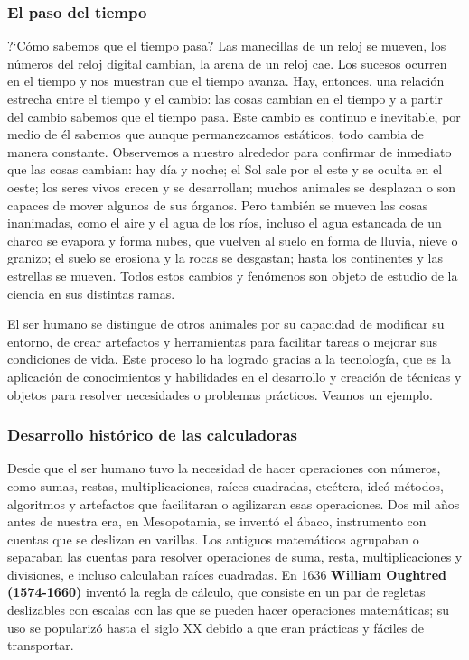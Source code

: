 \documentclass[11pt]{book}
\begin{document}
\subsubsection{El paso del tiempo}

?`C\'omo sabemos que el tiempo pasa? Las manecillas de un reloj se mueven, los
n\'umeros del reloj digital cambian, la arena de un
reloj cae. Los sucesos ocurren en el tiempo y nos muestran que el tiempo
avanza. Hay, entonces, una relaci\'on estrecha entre el
tiempo y el cambio: las cosas cambian en el tiempo y a partir del cambio
sabemos que el tiempo pasa. Este cambio es continuo e
inevitable, por medio de \'el sabemos que aunque permanezcamos est\'aticos, todo
cambia de manera constante.
Observemos a nuestro alrededor para confirmar de inmediato que las cosas
cambian: hay d\'ia y noche; el Sol sale por el este y
se oculta en el oeste; los seres vivos crecen y se desarrollan; muchos animales
se desplazan o son capaces de mover algunos de
sus \'organos. Pero tambi\'en se mueven las cosas inanimadas, como el aire y el
agua de los r\'ios, incluso el agua estancada de un
charco se evapora y forma nubes, que vuelven al suelo en forma de lluvia, nieve
o granizo; el suelo se erosiona y la rocas se
desgastan; hasta los continentes y las estrellas se mueven. Todos estos cambios
y fen\'omenos son objeto de estudio de la ciencia
en sus distintas ramas.

El ser humano se distingue de otros animales por su capacidad de modificar su
entorno, de crear artefactos y herramientas para
facilitar tareas o mejorar sus condiciones de vida. Este proceso lo ha logrado
gracias a la tecnolog\'ia, que es la aplicaci\'on de
conocimientos y habilidades en el desarrollo y creaci\'on de t\'ecnicas y objetos
para resolver necesidades o problemas pr\'acticos.
Veamos un ejemplo.

\subsubsection{Desarrollo hist\'orico de las calculadoras}
Desde que el ser humano tuvo la necesidad de hacer operaciones con n\'umeros,
como sumas, restas, multiplicaciones, ra\'ices
cuadradas, etc\'etera, ide\'o m\'etodos, algoritmos y artefactos que facilitaran o
agilizaran esas operaciones.
Dos mil años antes de nuestra era, en Mesopotamia, se invent\'o el \'abaco,
instrumento con cuentas que se deslizan en varillas.
Los antiguos matem\'aticos agrupaban o separaban las cuentas para resolver
operaciones de suma, resta, multiplicaciones y
divisiones, e incluso calculaban ra\'ices cuadradas.
En 1636 \textbf{William Oughtred (1574-1660)} invent\'o la regla de c\'alculo, que
consiste en un par de regletas deslizables con
escalas con las que se pueden hacer operaciones matem\'aticas; su uso se
populariz\'o hasta el siglo XX debido a que eran pr\'acticas
y f\'aciles de transportar.
\end{document}

